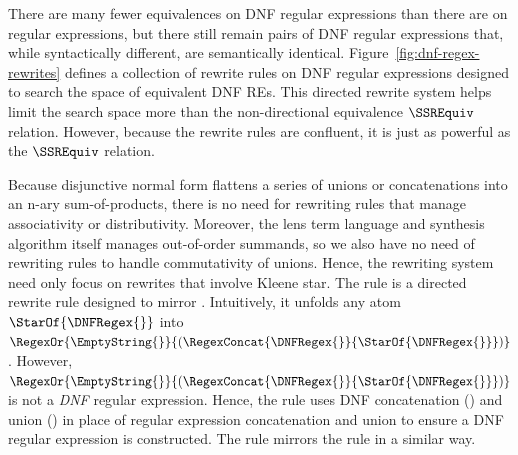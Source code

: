 \documentclass[sigplan,acmsmall]{acmart}
\begin{document}
There are many fewer equivalences on DNF regular expressions than there are on
regular expressions, but there
still remain pairs of DNF regular expressions that, while syntactically different,
are semantically identical.  
Figure~\ref{fig:dnf-regex-rewrites} defines a collection of rewrite rules on DNF regular expressions
designed to search the space of equivalent DNF REs.  
This directed rewrite system helps limit
the search space more than the non-directional equivalence $\SSREquiv$ relation.
However, because the rewrite rules are confluent, it is just as powerful as the
$\SSREquiv$ relation.
 

Because disjunctive normal form flattens a series of unions or concatenations
into an n-ary sum-of-products,
there is no need for rewriting rules that manage associativity or
distributivity.  Moreover, the lens term language and synthesis algorithm itself manages out-of-order summands, so we also have no need of rewriting
rules to handle commutativity of unions.  Hence, the rewriting system
need only focus on rewrites that involve Kleene star.
The rule \AtomUnrollstarLeftRule{} is a directed rewrite rule
designed to mirror \UnrollstarLeftRule{}.  Intuitively, it unfolds any atom 
$\StarOf{\DNFRegex{}}$ into $\RegexOr{\EmptyString{}}{(\RegexConcat{\DNFRegex{}}{\StarOf{{\DNFRegex{}}}})}$.  However, 
$\RegexOr{\EmptyString{}}{(\RegexConcat{\DNFRegex{}}{\StarOf{{\DNFRegex{}}}})}$ is
not a \emph{DNF} regular expression.  Hence, the rule uses DNF concatenation (\ConcatDNF)
and union (\OrDNF) in place of regular expression concatenation and union
to ensure a DNF regular expression is constructed.  The rule
\AtomUnrollstarRightRule{} mirrors the rule \UnrollstarRightRule{} in 
a similar way.
\end{document}

